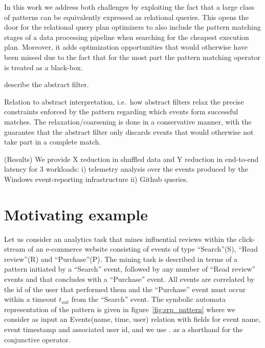 In this work we address both challenges by exploiting the fact that a large 
class of patterns can be equivalently expressed as relational queries.
This opens the door for the relational query plan optimizers to also include 
the pattern matching stages of a data processing pipeline when searching for 
the cheapest execution plan.
Moreover, it adds optimization opportunities that would otherwise have been 
missed due to the fact that for the most part the  pattern matching operator is 
treated as a black-box.

describe the abstract filter.

Relation to abstract interpretation, i.e.\ how abstract filters relax the 
precise constraints enforced by the pattern regarding which events form 
successful matches. 
The relaxation/coarsening is done in a conservative manner, with the guarantee 
that the abstract filter only discards events that would otherwise not take 
part in a complete match. 

(Results)
We provide X reduction in shuffled data and Y reduction in end-to-end latency
for 3 workloads:
i) telemetry analysis over the events produced by the Windows event-reporting
infrastructure
ii) Github queries.









\section{Motivating example}

Let us consider an analytics task that mines influential reviews
within the click-stream of an e-commerce website consisting of events of type
``Search''(S), ``Read review''(R) and ``Purchase''(P).
The mining task is described in terms of a pattern initiated by a ``Search''
event, followed by any number of ``Read review'' events and that concludes with
a ``Purchase'' event. 
All events are correlated by the id of the user that performed them and the
``Purchase'' event must occur within a timeout $t_{out}$ from the ``Search'' event. 
The symbolic automata representation of the pattern is given in
figure~\ref{fig:srp_pattern} where we consider as input an Events(name, time,
user) relation with fields for event name, event timestamp and
associated user id, and we use $.$ as a shorthand for the conjunctive operator.

